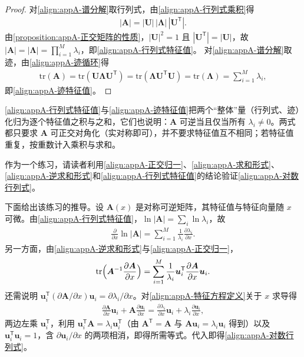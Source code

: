 \documentclass[../main.tex]{subfiles}
\begin{document}
\begin{proof}
对\eqref{align:appA-谱分解}取行列式，由\eqref{align:appA-行列式乘积}得
\begin{align*}
 |\bm{A}|=|\bm{U}|\,|\bm{\Lambda}|\,|\bm{U}^{\mathsf{T}}|.
\end{align*}
由\cref{proposition:appA-正交矩阵的性质}，$|\bm{U}|^{2}=1$ 且 $|\bm{U}^{\mathsf{T}}|=|\bm{U}|$，故 $|\bm{A}|=|\bm{\Lambda}|=\prod_{i=1}^{M}\lambda_i$，即\eqref{align:appA-行列式特征值}。
对\eqref{align:appA-谱分解}取迹，由\eqref{align:appA-迹循环}得
\begin{align*}
 \mathrm{tr}(\bm{A})=\mathrm{tr}(\bm{U}\bm{\Lambda}\bm{U}^{\mathsf{T}})=\mathrm{tr}(\bm{\Lambda}\bm{U}^{\mathsf{T}}\bm{U})=\mathrm{tr}(\bm{\Lambda})=\sum_{i=1}^{M}\lambda_i,
\end{align*}
即\eqref{align:appA-迹特征值}。
\end{proof}

\begin{remark}
\eqref{align:appA-行列式特征值}与\eqref{align:appA-迹特征值}把两个“整体”量（行列式、迹）化归为逐个特征值之积与之和，它们也说明：$\bm{A}$ 可逆当且仅当所有 $\lambda_i\neq0$。两式都只要求 $\bm{A}$ 可正交对角化（实对称即可），并不要求特征值互不相同；若特征值重复，按重数计入乘积与求和。
\end{remark}

作为一个练习，请读者利用\eqref{align:appA-正交归一}、\eqref{align:appA-求和形式}、\eqref{align:appA-逆求和形式}和\eqref{align:appA-行列式特征值}的结论验证\eqref{align:appA-对数行列式}。

\begin{remark}
下面给出该练习的推导。设 $\bm{A}(x)$ 是对称可逆矩阵，其特征值与特征向量随 $x$ 可微。由\eqref{align:appA-行列式特征值}，$\ln|\bm{A}|=\sum_i\ln\lambda_i$，故
\begin{align*}
  \frac{\partial}{\partial x}\ln|\bm{A}|=\sum_{i=1}^{M}\frac{1}{\lambda_i}\frac{\partial\lambda_i}{\partial x}.
\end{align*}
另一方面，由\eqref{align:appA-逆求和形式}与\eqref{align:appA-正交归一}，
\begin{align*}
  \mathrm{tr}\Bigl(\bm{A}^{-1}\frac{\partial\bm{A}}{\partial x}\Bigr)=\sum_{i=1}^{M}\frac{1}{\lambda_i}\bm{u}_i^{\mathsf{T}}\frac{\partial\bm{A}}{\partial x}\bm{u}_i.
\end{align*}
还需说明 $\bm{u}_i^{\mathsf{T}}(\partial\bm{A}/\partial x)\bm{u}_i=\partial\lambda_i/\partial x$。对\eqref{align:appA-特征方程定义}关于 $x$ 求导得
\begin{align*}
  \frac{\partial\bm{A}}{\partial x}\bm{u}_i+\bm{A}\frac{\partial\bm{u}_i}{\partial x}=\frac{\partial\lambda_i}{\partial x}\bm{u}_i+\lambda_i\frac{\partial\bm{u}_i}{\partial x},
\end{align*}
两边左乘 $\bm{u}_i^{\mathsf{T}}$，利用 $\bm{u}_i^{\mathsf{T}}\bm{A}=\lambda_i\bm{u}_i^{\mathsf{T}}$（由 $\bm{A}^{\mathsf{T}}=\bm{A}$ 与 $\bm{A}\bm{u}_i=\lambda_i\bm{u}_i$ 得到）以及 $\bm{u}_i^{\mathsf{T}}\bm{u}_i=1$，含 $\partial\bm{u}_i/\partial x$ 的两项相消，即得所需等式。代入即得\eqref{align:appA-对数行列式}。
\end{remark}
\end{document}
